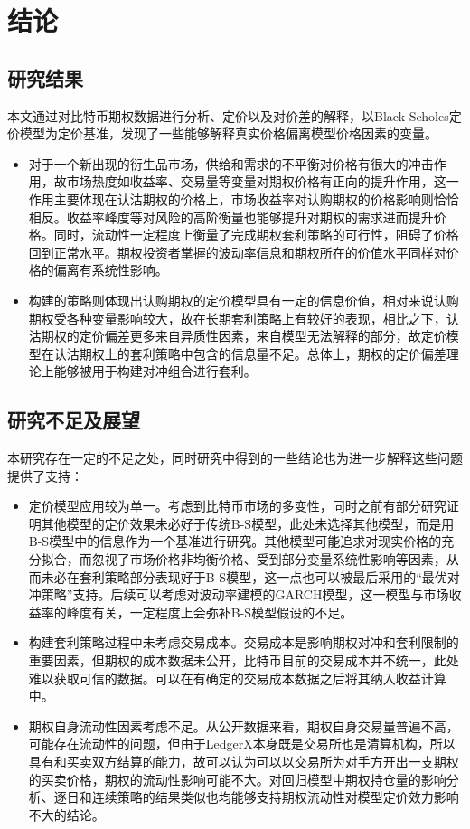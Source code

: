 \chapter{结论}
\section{研究结果}
本文通过对比特币期权数据进行分析、定价以及对价差的解释，以Black-Scholes定价模型为定价基准，发现了一些能够解释真实价格偏离模型价格因素的变量。
\begin{itemize}
    \item 对于一个新出现的衍生品市场，供给和需求的不平衡对价格有很大的冲击作用，故市场热度如收益率、交易量等变量对期权价格有正向的提升作用，这一作用主要体现在认沽期权的价格上，市场收益率对认购期权的价格影响则恰恰相反。收益率峰度等对风险的高阶衡量也能够提升对期权的需求进而提升价格。同时，流动性一定程度上衡量了完成期权套利策略的可行性，阻碍了价格回到正常水平。期权投资者掌握的波动率信息和期权所在的价值水平同样对价格的偏离有系统性影响。
    \item 构建的策略则体现出认购期权的定价模型具有一定的信息价值，相对来说认购期权受各种变量影响较大，故在长期套利策略上有较好的表现，相比之下，认沽期权的定价偏差更多来自异质性因素，来自模型无法解释的部分，故定价模型在认沽期权上的套利策略中包含的信息量不足。总体上，期权的定价偏差理论上能够被用于构建对冲组合进行套利。
\end{itemize}

\section{研究不足及展望}
本研究存在一定的不足之处，同时研究中得到的一些结论也为进一步解释这些问题提供了支持：
\begin{itemize}
    \item 定价模型应用较为单一。考虑到比特币市场的多变性，同时之前有部分研究证明其他模型的定价效果未必好于传统B-S模型，此处未选择其他模型，而是用B-S模型中的信息作为一个基准进行研究。其他模型可能追求对现实价格的充分拟合，而忽视了市场价格非均衡价格、受到部分变量系统性影响等因素，从而未必在套利策略部分表现好于B-S模型，这一点也可以被最后采用的“最优对冲策略”支持。后续可以考虑对波动率建模的GARCH模型，这一模型与市场收益率的峰度有关，一定程度上会弥补B-S模型假设的不足。
    \item 构建套利策略过程中未考虑交易成本。交易成本是影响期权对冲和套利限制的重要因素，但期权的成本数据未公开，比特币目前的交易成本并不统一，此处难以获取可信的数据。可以在有确定的交易成本数据之后将其纳入收益计算中。
    \item 期权自身流动性因素考虑不足。从公开数据来看，期权自身交易量普遍不高，可能存在流动性的问题，但由于LedgerX本身既是交易所也是清算机构，所以具有和买卖双方结算的能力，故可以认为可以以交易所为对手方开出一支期权的买卖价格，期权的流动性影响可能不大。对回归模型中期权持仓量的影响分析、逐日和连续策略的结果类似也均能够支持期权流动性对模型定价效力影响不大的结论。
\end{itemize}